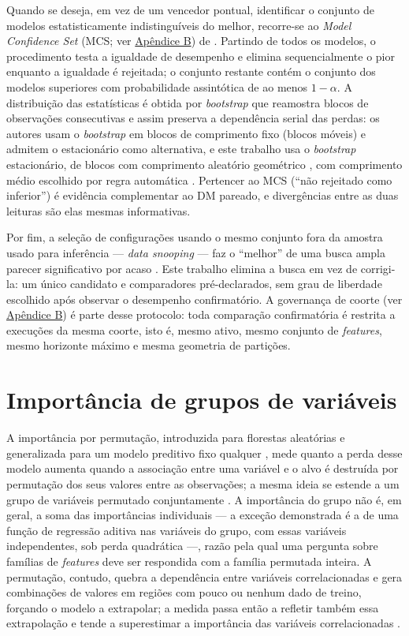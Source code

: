 Quando se deseja, em vez de um vencedor pontual, identificar o conjunto de modelos estatisticamente indistinguíveis do melhor, recorre-se ao \textit{Model Confidence Set} (MCS; ver \hyperref[gl:mcs]{Apêndice B}) de . Partindo de todos os modelos, o procedimento testa a igualdade de desempenho e elimina sequencialmente o pior enquanto a igualdade é rejeitada; o conjunto restante contém o conjunto dos modelos superiores com probabilidade assintótica de ao menos \(1-\alpha\). A distribuição das estatísticas é obtida por \textit{bootstrap} que reamostra blocos de observações consecutivas e assim preserva a dependência serial das perdas: os autores usam o \textit{bootstrap} em blocos de comprimento fixo (blocos móveis) e admitem o estacionário como alternativa, e este trabalho usa o \textit{bootstrap} estacionário, de blocos com comprimento aleatório geométrico \cite{POLITISROMANO1994}, com comprimento médio escolhido por regra automática \cite{POLITISWHITE2004,PATTON2009}. Pertencer ao MCS (``não rejeitado como inferior'') é evidência complementar ao DM pareado, e divergências entre as duas leituras são elas mesmas informativas.

Por fim, a seleção de configurações usando o mesmo conjunto fora da amostra usado para inferência --- \textit{data snooping} --- faz o ``melhor'' de uma busca ampla parecer significativo por acaso \cite{WHITE2000,ROMANOWOLF2005}. Este trabalho elimina a busca em vez de corrigi-la: um único candidato e comparadores pré-declarados, sem grau de liberdade escolhido após observar o desempenho confirmatório. A governança de coorte (ver \hyperref[gl:coorte]{Apêndice B}) é parte desse protocolo: toda comparação confirmatória é restrita a execuções da mesma coorte, isto é, mesmo ativo, mesmo conjunto de \textit{features}, mesmo horizonte máximo e mesma geometria de partições.

\section{Importância de grupos de variáveis}\label{sec:atribuicao}
A importância por permutação, introduzida para florestas aleatórias \cite{BREIMAN2001} e generalizada para um modelo preditivo fixo qualquer \cite{FISHER2019}, mede quanto a perda desse modelo aumenta quando a associação entre uma variável e o alvo é destruída por permutação dos seus valores entre as observações; a mesma ideia se estende a um grupo de variáveis permutado conjuntamente \cite{FISHER2019,GREGORUTTI2015}. A importância do grupo não é, em geral, a soma das importâncias individuais --- a exceção demonstrada é a de uma função de regressão aditiva nas variáveis do grupo, com essas variáveis independentes, sob perda quadrática \cite{GREGORUTTI2015} ---, razão pela qual uma pergunta sobre famílias de \textit{features} deve ser respondida com a família permutada inteira. A permutação, contudo, quebra a dependência entre variáveis correlacionadas e gera combinações de valores em regiões com pouco ou nenhum dado de treino, forçando o modelo a extrapolar; a medida passa então a refletir também essa extrapolação e tende a superestimar a importância das variáveis correlacionadas \cite{HOOKER2021}.


